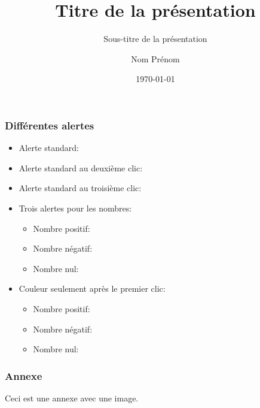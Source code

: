 \documentclass[
    11pt, aspectratio = 169,
    xcolor = {dvipsnames},
    hyperref = {pdftex, pdfpagemode=UseNone, hidelinks, pdfdisplaydoctitle=true},
    usepdftitle = false
]{beamer}
\title{Titre de la présentation} %
\subtitle{Sous-titre de la présentation} %
\author{Nom Prénom} %
\date{\today} %
\begin{document}
\titleframe





\begin{frame}
    \frametitle{Différentes alertes}
    \begin{itemize}
        \item Alerte standard: 
        \item Alerte standard au deuxième clic: 
        \item Alerte standard au troisième clic: 
        \item Trois alertes pour les nombres:
              \begin{itemize}
                  \item Nombre positif: 
                  \item Nombre négatif: 
                  \item Nombre nul: 
              \end{itemize}
        \item Couleur seulement après le premier clic:
              \begin{itemize}
                  \item Nombre positif: 
                  \item Nombre négatif: 
                  \item Nombre nul: 
              \end{itemize}
    \end{itemize}
\end{frame}


\begin{frame}
    \frametitle{Annexe}
    Ceci est une annexe avec une image.    
\end{frame}
\end{document}
